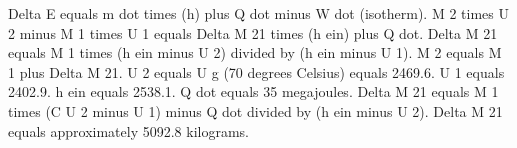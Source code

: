 Delta E equals m dot times (h) plus Q dot minus W dot (isotherm).  
M 2 times U 2 minus M 1 times U 1 equals Delta M 21 times (h ein) plus Q dot.  
Delta M 21 equals M 1 times (h ein minus U 2) divided by (h ein minus U 1).  
M 2 equals M 1 plus Delta M 21.  
U 2 equals U g (70 degrees Celsius) equals 2469.6.  
U 1 equals 2402.9.  
h ein equals 2538.1.  
Q dot equals 35 megajoules.  
Delta M 21 equals M 1 times (C U 2 minus U 1) minus Q dot divided by (h ein minus U 2).  
Delta M 21 equals approximately 5092.8 kilograms.